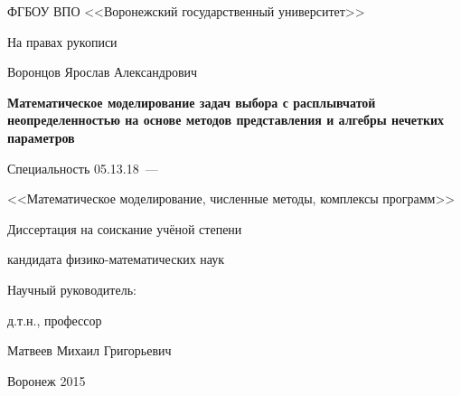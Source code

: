 \thispagestyle{empty}

\begin{center}
ФГБОУ ВПО <<Воронежский государственный университет>>\par
\par 
\par
\end{center}

\vspace{10mm}
\begin{flushright}
На правах рукописи \\
\end{flushright}

\vspace{15mm}
\begin{center}
{\large Воронцов Ярослав Александрович}
\end{center}

\vspace{5mm}
\begin{center}
{\bf \large Математическое моделирование задач выбора с расплывчатой неопределенностью на основе методов представления и алгебры нечетких параметров
\par}

\vspace{10mm}
{%
Специальность 05.13.18~---

<<Математическое моделирование, численные методы, комплексы программ>>
}

\vspace{10mm}
Диссертация на соискание учёной степени

кандидата физико-математических наук
\end{center}

\vspace{15mm}
\begin{flushright}
Научный руководитель:

д.т.н., профессор

Матвеев Михаил Григорьевич

\end{flushright}

\vspace{20mm}
\begin{center}
{Воронеж 2015}
\end{center}

\newpage